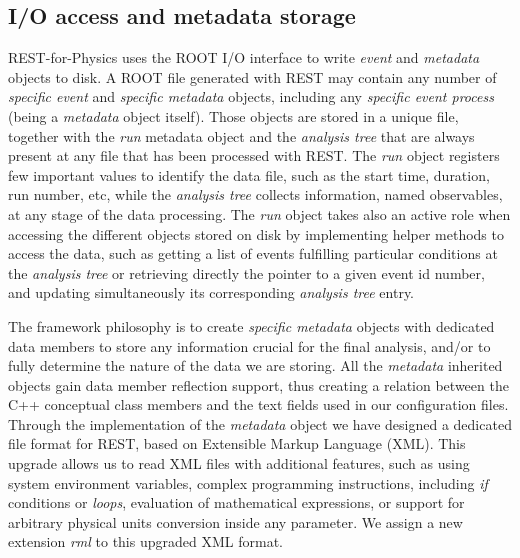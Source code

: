 



\subsection{I/O access and metadata storage}



REST-for-Physics uses the ROOT I/O interface to write \emph{event} and \emph{metadata} objects to disk. A ROOT file generated with REST may contain any number of \emph{specific event} and \emph{specific metadata} objects, including any \emph{specific event process} (being a \emph{metadata} object itself). Those objects are stored in a unique file, together with the \emph{run} metadata object and the \emph{analysis tree} that are always present at any file that has been processed with REST. The \emph{run} object registers few important values to identify the data file, such as the start time, duration, run number, etc, while the \emph{analysis tree} collects information, named observables, at any stage of the data processing. The \emph{run} object takes also an active role when accessing the different objects stored on disk by implementing helper methods to access the data, such as getting a list of events fulfilling particular conditions at the \emph{analysis tree} or retrieving directly the pointer to a given event id number, and updating simultaneously its corresponding \emph{analysis tree} entry.

The framework philosophy is to create \emph{specific metadata} objects with dedicated data members to store any information crucial for the final analysis, and/or to fully determine the nature of the data we are storing. All the \emph{metadata} inherited objects gain data member reflection support, thus creating a relation between the C++ conceptual class members and the text fields used in our configuration files. Through the implementation of the \emph{metadata} object we have designed a dedicated file format for REST, based on Extensible Markup Language (XML). This upgrade allows us to read XML files with additional features, such as using system environment variables, complex programming instructions, including \emph{if} conditions or \emph{loops}, evaluation of mathematical expressions, or support for arbitrary physical units conversion inside any parameter. We assign a new extension \emph{rml} to this upgraded XML format.

